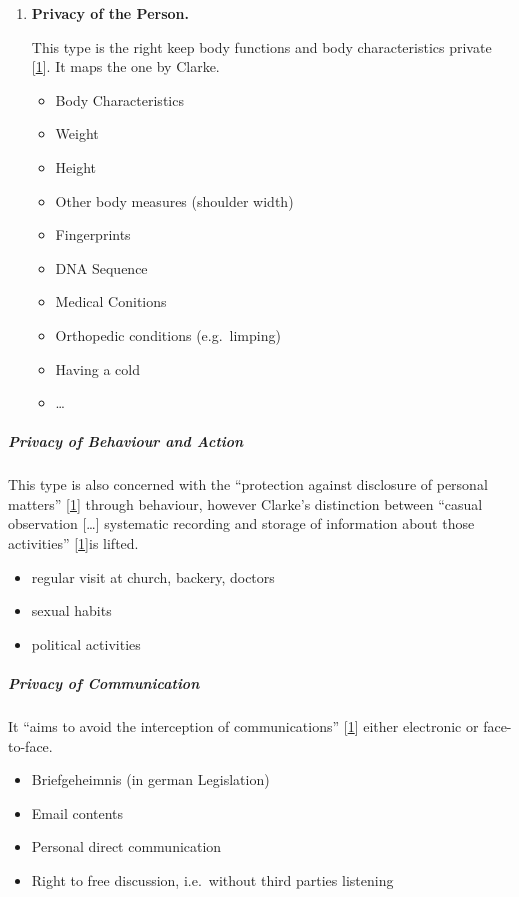 \begin{enumerate}
\item \textbf{Privacy of the Person.}

This type is the right keep body functions and body characteristics
private {[}\hyperref[references]{1}{]}. It maps the one by Clarke.

\begin{itemize}
\itemsep1pt\parskip0pt
\item
  Body Characteristics
\item
  Weight
\item
  Height
\item
  Other body measures (shoulder width)
\item
  Fingerprints
\item
  DNA Sequence
\item
  Medical Conitions
\item
  Orthopedic conditions (e.g.~limping)
\item
  Having a cold
\item
  \ldots{}
\end{itemize}
\end{enumerate}

\subparagraph{Privacy of Behaviour and Action}

This type is also concerned with the ``protection against disclosure of
personal matters'' {[}\hyperref[references]{1}{]} through behaviour,
however Clarke's distinction between ``casual observation {[}\ldots{}{]}
systematic recording and storage of information about those activities''
{[}\hyperref[references]{1}{]}is lifted.

\begin{itemize}
\itemsep1pt\parskip0pt
\item
  regular visit at church, backery, doctors
\item
  sexual habits
\item
  political activities
\end{itemize}

\subparagraph{Privacy of Communication}

It ``aims to avoid the interception of communications''
{[}\hyperref[references]{1}{]} either electronic or face-to-face.

\begin{itemize}
\itemsep1pt\parskip0pt
\item
  Briefgeheimnis (in german Legislation)
\item
  Email contents
\item
  Personal direct communication
\item
  Right to free discussion, i.e.~without third parties listening
\end{itemize}

